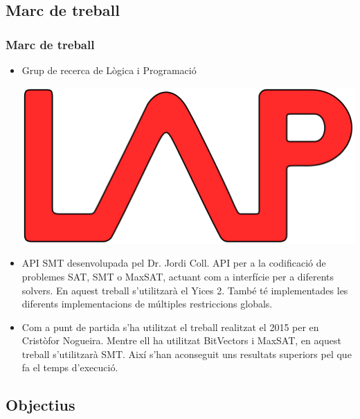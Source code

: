 \documentclass[11pt]{beamer}
\begin{document}
  \subsection{Marc de treball}
  \begin{frame}
    \frametitle{Marc de treball}
    \begin{itemize}
      \item \begin{minipage}{.55\textwidth}
        Grup de recerca de Lògica i Programació
      \end{minipage} 
      \begin{minipage}{.15\textwidth}
        \includegraphics[width=\textwidth]{Diagrames/LAP.png}
      \end{minipage} 
      \item API SMT desenvolupada pel Dr. Jordi Coll. API per a la codificació de problemes SAT, SMT o MaxSAT, 
      actuant com a interfície per a diferents solvers. En aquest treball s'utilitzarà el Yices 2. 
      També té implementades les diferents implementacions de múltiples restriccions globals.

      \item Com a punt de partida s'ha utilitzat el treball realitzat el 2015 per en Cristòfor Nogueira. 
      Mentre ell ha utilitzat BitVectors i MaxSAT, en aquest treball s'utilitzarà SMT. 
      Així s'han aconseguit uns resultats superiors pel que fa el temps d'execució.
    \end{itemize}

  \end{frame}
  
  \subsection{Objectius}
\end{document}
